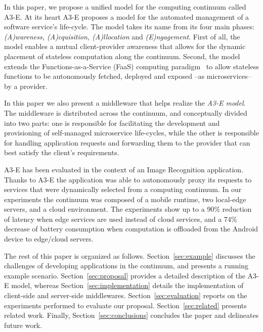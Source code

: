 In this paper, we propose a unified model for the computing continuum called A3-E. At its heart A3-E proposes a model for the automated management of a software service's life-cycle. The model takes its name from its four main phases: \textit{(A)wareness, (A)cquisition, (A)llocation} and \textit{(E)ngagement}. First of all, the model enables a mutual client-provider awareness that allows for the dynamic placement of stateless computation along the continuum. Second, the model extends the Functions-as-a-Service (FaaS) computing paradigm~\cite{Hendrickson:2016,baldini2017serverless,GarrigaMendonca2017} to allow stateless functions to be autonomously fetched, deployed and exposed --as microservices-- by a provider. 

In this paper we also present a middleware that helps realize the \textit{A3-E model}. The middleware is distributed across the continuum, and conceptually divided into two parts: one is responsible for facilitating the development and provisioning of self-managed microservice life-cycles, while the other is responsible for handling application requests and forwarding them to the provider that can best satisfy the client's requirements.



A3-E has been evaluated in the context of an Image Recognition application. Thanks to A3-E the application was able to autonomously proxy its requests to services that were dynamically selected from a computing continuum. In our experiments the continuum was composed of a mobile runtime, two local-edge servers, and a cloud environment. The experiments show up to a $90$\% reduction of latency when edge services are used instead of cloud services, and a $74$\% decrease of battery consumption when computation is offloaded from the Android device to edge/cloud servers. 

The rest of this paper is organized as follows. Section~\ref{sec:example} discusses the challenges of developing applications in the continuum, and presents a running example scenario. Section~\ref{sec:proposal} provides a detailed description of the A3-E model, whereas Section~\ref{sec:implementation} details the implementation of client-side and server-side middlewares. Section~\ref{sec:evaluation} reports on the experiments performed to evaluate our proposal. Section~\ref{sec:related} presents related work. Finally, Section~\ref{sec:conclusions} concludes the paper and delineates future work.

